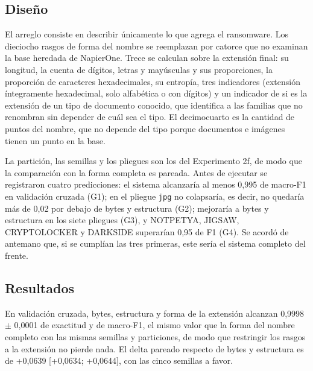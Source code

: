 \subsection{Diseño}

El arreglo consiste en describir únicamente lo que agrega el ransomware. Los dieciocho rasgos de forma del nombre se reemplazan por catorce que no examinan la base heredada de NapierOne. Trece se calculan sobre la extensión final: su longitud, la cuenta de dígitos, letras y mayúsculas y sus proporciones, la proporción de caracteres hexadecimales, su entropía, tres indicadores (extensión íntegramente hexadecimal, solo alfabética o con dígitos) y un indicador de si es la extensión de un tipo de documento conocido, que identifica a las familias que no renombran sin depender de cuál sea el tipo. El decimocuarto es la cantidad de puntos del nombre, que no depende del tipo porque documentos e imágenes tienen un punto en la base.

La partición, las semillas y los pliegues son los del Experimento 2f, de modo que la comparación con la forma completa es pareada. Antes de ejecutar se registraron cuatro predicciones: el sistema alcanzaría al menos 0,995 de macro-F1 en validación cruzada (G1); en el pliegue \texttt{jpg} no colapsaría, es decir, no quedaría más de 0,02 por debajo de bytes y estructura (G2); mejoraría a bytes y estructura en los siete pliegues (G3), y NOTPETYA, JIGSAW, CRYPTOLOCKER y DARKSIDE superarían 0,95 de F1 (G4). Se acordó de antemano que, si se cumplían las tres primeras, este sería el sistema completo del frente.

\subsection{Resultados}

En validación cruzada, bytes, estructura y forma de la extensión alcanzan 0,9998 $\pm$ 0,0001 de exactitud y de macro-F1, el mismo valor que la forma del nombre completo con las mismas semillas y particiones, de modo que restringir los rasgos a la extensión no pierde nada. El delta pareado respecto de bytes y estructura es de +0,0639 [+0,0634; +0,0644], con las cinco semillas a favor.

